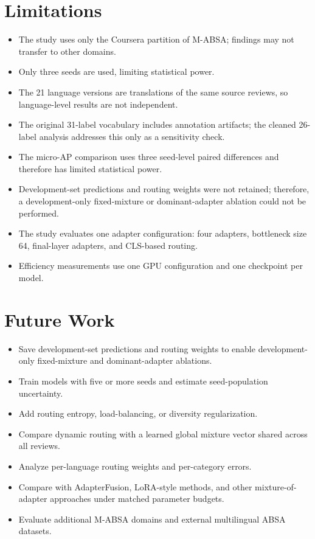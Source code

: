 \documentclass[review,12pt]{elsarticle}
\begin{document}
\section{Limitations}
\begin{itemize}
\item The study uses only the Coursera partition of M-ABSA; findings may not transfer to other domains.
\item Only three seeds are used, limiting statistical power.
\item The 21 language versions are translations of the same source reviews, so language-level results are not independent.
\item The original 31-label vocabulary includes annotation artifacts; the cleaned 26-label analysis addresses this only as a sensitivity check.
\item The micro-AP comparison uses three seed-level paired differences and therefore has limited statistical power.
\item Development-set predictions and routing weights were not retained; therefore, a development-only fixed-mixture or dominant-adapter ablation could not be performed.
\item The study evaluates one adapter configuration: four adapters, bottleneck size 64, final-layer adapters, and CLS-based routing.
\item Efficiency measurements use one GPU configuration and one checkpoint per model.
\end{itemize}

\section{Future Work}
\begin{itemize}
\item Save development-set predictions and routing weights to enable development-only fixed-mixture and dominant-adapter ablations.
\item Train models with five or more seeds and estimate seed-population uncertainty.
\item Add routing entropy, load-balancing, or diversity regularization.
\item Compare dynamic routing with a learned global mixture vector shared across all reviews.
\item Analyze per-language routing weights and per-category errors.
\item Compare with AdapterFusion, LoRA-style methods, and other mixture-of-adapter approaches under matched parameter budgets.
\item Evaluate additional M-ABSA domains and external multilingual ABSA datasets.
\end{itemize}
\end{document}

